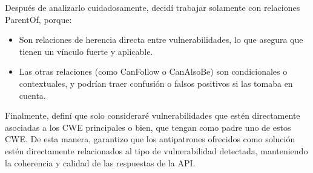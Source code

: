 Después de analizarlo cuidadosamente, decidí trabajar solamente con relaciones ParentOf, porque:
\begin{itemize}
    \item Son relaciones de herencia directa entre vulnerabilidades, lo que asegura que tienen un vínculo fuerte y aplicable.
    \item Las otras relaciones (como CanFollow o CanAlsoBe) son condicionales o contextuales, y podrían traer confusión o falsos positivos si las tomaba en cuenta.
\end{itemize}


Finalmente, definí que solo consideraré vulnerabilidades que estén directamente asociadas a los CWE principales o bien, que tengan como padre uno de estos CWE. De esta manera, garantizo que los antipatrones ofrecidos como solución estén directamente relacionados al tipo de vulnerabilidad detectada, manteniendo la coherencia y calidad de las respuestas de la API.



